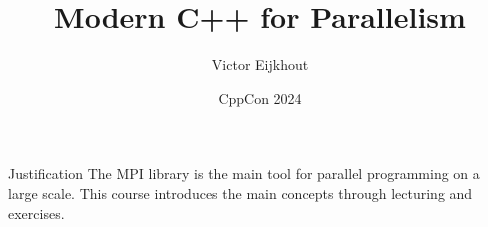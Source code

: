 \documentclass[10pt]{beamer}
\begin{document}


\author[Eijkhout]{Victor Eijkhout}
\date[CppCon2024]{CppCon 2024}
\title[C++ Parallel]{Modern C++ for Parallelism}
\maketitle

\begin{frame}{Justification}
  The MPI library is the main tool
  for parallel programming on a large scale.
  This course introduces the main concepts
  through lecturing and exercises.
\end{frame}
\end{document}
